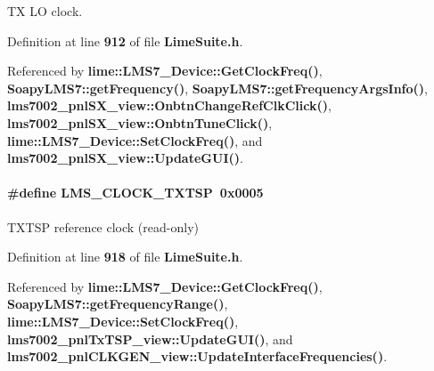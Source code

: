 TX LO clock. 



Definition at line {\bf 912} of file {\bf Lime\+Suite.\+h}.



Referenced by {\bf lime\+::\+L\+M\+S7\+\_\+\+Device\+::\+Get\+Clock\+Freq()}, {\bf Soapy\+L\+M\+S7\+::get\+Frequency()}, {\bf Soapy\+L\+M\+S7\+::get\+Frequency\+Args\+Info()}, {\bf lms7002\+\_\+pnl\+S\+X\+\_\+view\+::\+Onbtn\+Change\+Ref\+Clk\+Click()}, {\bf lms7002\+\_\+pnl\+S\+X\+\_\+view\+::\+Onbtn\+Tune\+Click()}, {\bf lime\+::\+L\+M\+S7\+\_\+\+Device\+::\+Set\+Clock\+Freq()}, and {\bf lms7002\+\_\+pnl\+S\+X\+\_\+view\+::\+Update\+G\+U\+I()}.

\paragraph[{L\+M\+S\+\_\+\+C\+L\+O\+C\+K\+\_\+\+T\+X\+T\+SP}]{\setlength{\rightskip}{0pt plus 5cm}\#define L\+M\+S\+\_\+\+C\+L\+O\+C\+K\+\_\+\+T\+X\+T\+SP~0x0005}\label{group__LMS__CLOCK__ID_ga1b52330283adbc22c63d18497ac7226a}


T\+X\+T\+SP reference clock (read-\/only) 



Definition at line {\bf 918} of file {\bf Lime\+Suite.\+h}.



Referenced by {\bf lime\+::\+L\+M\+S7\+\_\+\+Device\+::\+Get\+Clock\+Freq()}, {\bf Soapy\+L\+M\+S7\+::get\+Frequency\+Range()}, {\bf lime\+::\+L\+M\+S7\+\_\+\+Device\+::\+Set\+Clock\+Freq()}, {\bf lms7002\+\_\+pnl\+Tx\+T\+S\+P\+\_\+view\+::\+Update\+G\+U\+I()}, and {\bf lms7002\+\_\+pnl\+C\+L\+K\+G\+E\+N\+\_\+view\+::\+Update\+Interface\+Frequencies()}.

